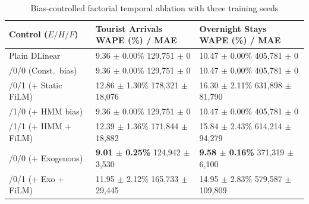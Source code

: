 \begin{table}[!htbp]
\centering
\caption{Bias-controlled factorial temporal ablation with three training seeds}
\label{tab:factorial_ablation}
\footnotesize
\setlength{\tabcolsep}{3pt}
\renewcommand{\arraystretch}{1.08}
\begin{tabular}{>{\raggedright\arraybackslash}p{2.35cm}>{\centering\arraybackslash}p{2.7cm}>{\centering\arraybackslash}p{2.7cm}}
\toprule
Control ($E/H/F$) & \shortstack{Tourist Arrivals\\WAPE (\%) / MAE} & \shortstack{Overnight Stays\\WAPE (\%) / MAE} \\
\midrule
Plain DLinear & \shortstack{9.36 $\pm$ 0.00\%\\{\scriptsize 129,751 $\pm$ 0}} & \shortstack{10.47 $\pm$ 0.00\%\\{\scriptsize 405,781 $\pm$ 0}} \\
0/0/0 (Const.\ bias) & \shortstack{9.36 $\pm$ 0.00\%\\{\scriptsize 129,751 $\pm$ 0}} & \shortstack{10.47 $\pm$ 0.00\%\\{\scriptsize 405,781 $\pm$ 0}} \\
0/0/1 (+ Static FiLM) & \shortstack{12.86 $\pm$ 1.30\%\\{\scriptsize 178,321 $\pm$ 18,076}} & \shortstack{16.30 $\pm$ 2.11\%\\{\scriptsize 631,898 $\pm$ 81,790}} \\
0/1/0 (+ HMM bias) & \shortstack{9.36 $\pm$ 0.00\%\\{\scriptsize 129,751 $\pm$ 0}} & \shortstack{10.47 $\pm$ 0.00\%\\{\scriptsize 405,781 $\pm$ 0}} \\
0/1/1 (+ HMM + FiLM) & \shortstack{12.39 $\pm$ 1.36\%\\{\scriptsize 171,844 $\pm$ 18,882}} & \shortstack{15.84 $\pm$ 2.43\%\\{\scriptsize 614,214 $\pm$ 94,279}} \\
1/0/0 (+ Exogenous) & \shortstack{\textbf{9.01 $\pm$ 0.25\%}\\{\scriptsize 124,942 $\pm$ 3,530}} & \shortstack{\textbf{9.58 $\pm$ 0.16\%}\\{\scriptsize 371,319 $\pm$ 6,100}} \\
1/0/1 (+ Exo + FiLM) & \shortstack{11.95 $\pm$ 2.12\%\\{\scriptsize 165,733 $\pm$ 29,445}} & \shortstack{14.95 $\pm$ 2.83\%\\{\scriptsize 579,587 $\pm$ 109,809}} \\

\end{tabular}
\end{table}
